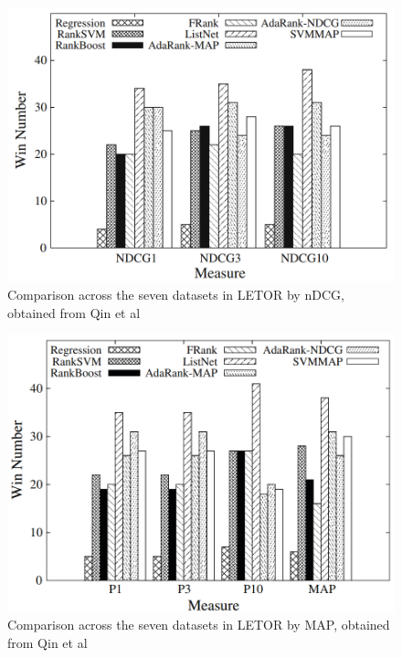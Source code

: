 \begin{figure}[!h]
\includegraphics[scale=0.30]{gfx/ndcg_winning_number}
\caption{Comparison across the seven datasets in LETOR by \ac{nDCG}, obtained from Qin et al\cite{Qin2010}}
\label{fig:ndcg_winning_number}
\end{figure}

\begin{figure}[!h]
\includegraphics[scale=0.30]{gfx/map_winning_number}
\caption{Comparison across the seven datasets in LETOR by \ac{MAP}, obtained from Qin et al\cite{Qin2010}}
\label{fig:map_winning_number}
\end{figure}

